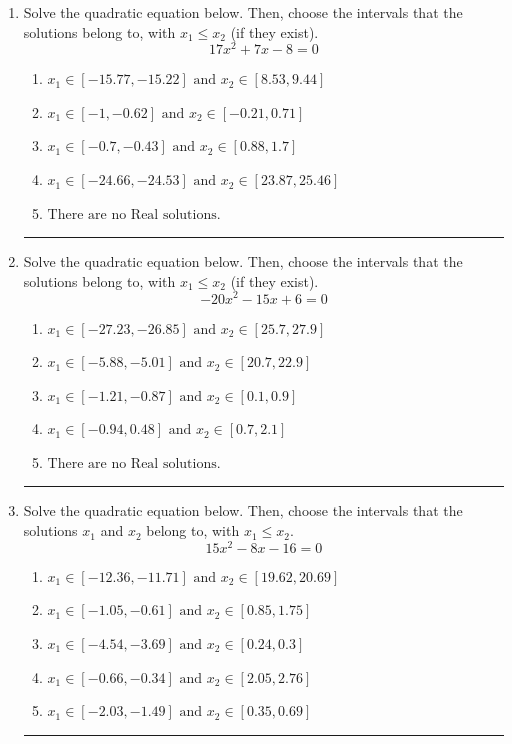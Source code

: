 \documentclass[14pt]{extbook}
\newcommand{\litem}[1]{\item#1\hspace*{-1cm}\rule{\textwidth}{0.4pt}}
\begin{document}
\begin{enumerate}
{\begin{enumerate}[label=\Alph*.]
\end{enumerate} }
\litem{
Solve the quadratic equation below. Then, choose the intervals that the solutions belong to, with $x_1 \leq x_2$ (if they exist).\[ 17x^{2} +7 x -8 = 0 \]\begin{enumerate}[label=\Alph*.]
\item \( x_1 \in [-15.77, -15.22] \text{ and } x_2 \in [8.53, 9.44] \)
\item \( x_1 \in [-1, -0.62] \text{ and } x_2 \in [-0.21, 0.71] \)
\item \( x_1 \in [-0.7, -0.43] \text{ and } x_2 \in [0.88, 1.7] \)
\item \( x_1 \in [-24.66, -24.53] \text{ and } x_2 \in [23.87, 25.46] \)
\item \( \text{There are no Real solutions.} \)

\end{enumerate} }
\litem{
Solve the quadratic equation below. Then, choose the intervals that the solutions belong to, with $x_1 \leq x_2$ (if they exist).\[ -20x^{2} -15 x + 6 = 0 \]\begin{enumerate}[label=\Alph*.]
\item \( x_1 \in [-27.23, -26.85] \text{ and } x_2 \in [25.7, 27.9] \)
\item \( x_1 \in [-5.88, -5.01] \text{ and } x_2 \in [20.7, 22.9] \)
\item \( x_1 \in [-1.21, -0.87] \text{ and } x_2 \in [0.1, 0.9] \)
\item \( x_1 \in [-0.94, 0.48] \text{ and } x_2 \in [0.7, 2.1] \)
\item \( \text{There are no Real solutions.} \)

\end{enumerate} }
\litem{
Solve the quadratic equation below. Then, choose the intervals that the solutions $x_1$ and $x_2$ belong to, with $x_1 \leq x_2$.\[ 15x^{2} -8 x -16 = 0 \]\begin{enumerate}[label=\Alph*.]
\item \( x_1 \in [-12.36, -11.71] \text{ and } x_2 \in [19.62, 20.69] \)
\item \( x_1 \in [-1.05, -0.61] \text{ and } x_2 \in [0.85, 1.75] \)
\item \( x_1 \in [-4.54, -3.69] \text{ and } x_2 \in [0.24, 0.3] \)
\item \( x_1 \in [-0.66, -0.34] \text{ and } x_2 \in [2.05, 2.76] \)
\item \( x_1 \in [-2.03, -1.49] \text{ and } x_2 \in [0.35, 0.69] \)


\end{enumerate}}
\end{enumerate}
\end{document}
